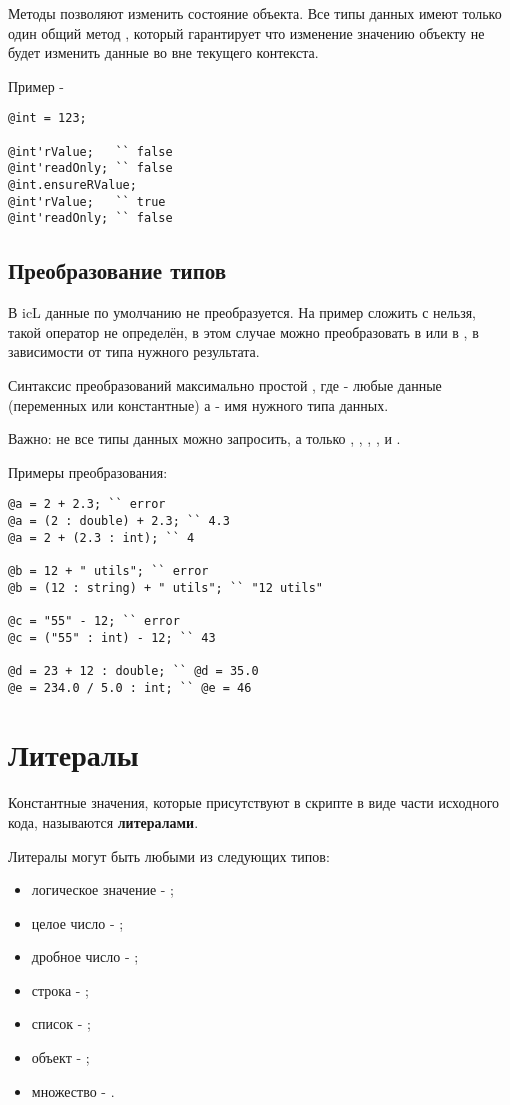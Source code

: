 \documentclass[a4paper, 14pt]{extarticle}
\newenvironment{icItems}
	{ \begin{itemize} [noitemsep,nolistsep] }
	{ \end{itemize} }
\begin{document}
Методы позволяют изменить состояние объекта. Все типы данных имеют только один общий метод , который гарантирует что изменение значению объекту не будет изменить данные во вне текущего контекста.

\noindent Пример -
\begin{lstlisting}
@int = 123;

@int'rValue;   `` false
@int'readOnly; `` false
@int.ensureRValue;
@int'rValue;   `` true
@int'readOnly; `` false
\end{lstlisting}

\subsection{Преобразование типов}

В icL данные по умолчанию не преобразуется. На пример сложить \integer{} с \double{} нельзя, такой оператор не определён, в этом случае можно преобразовать \integer{} в \double{} или \double{} в \integer{}, в зависимости от типа нужного результата.

Синтаксис преобразований максимально простой , где  - любые данные (переменных или константные) а  - имя нужного типа данных.

{\color{red} Важно:} не все типы данных можно запросить, а только \bool{}, \integer{}, \double{}, \str{}, \listtype{} и \object{}.

\noindent Примеры преобразования:
\begin{lstlisting}
@a = 2 + 2.3; `` error
@a = (2 : double) + 2.3; `` 4.3
@a = 2 + (2.3 : int); `` 4

@b = 12 + " utils"; `` error
@b = (12 : string) + " utils"; `` "12 utils"

@c = "55" - 12; `` error
@c = ("55" : int) - 12; `` 43

@d = 23 + 12 : double; `` @d = 35.0
@e = 234.0 / 5.0 : int; `` @e = 46
\end{lstlisting}

\newpage
\section{Литералы}

Константные значения, которые присутствуют в скрипте в виде части исходного кода, называются {\bf литералами}.

Литералы могут быть любыми из следующих типов:

\begin{icItems}
	\item
		логическое значение - \bool{};
	\item
		целое число - \integer{};
	\item
		дробное число - \double{};
	\item
		строка - \str{};
	\item
		список - \listtype{};
	\item
		объект - \object{};
	\item
		множество - \set{}.
\end{icItems}
\end{document}
